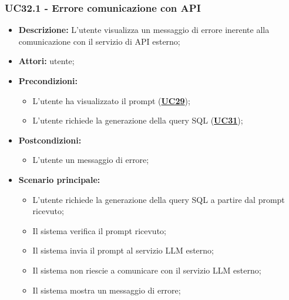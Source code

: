\subsubsection{UC32.1 - Errore comunicazione con API}
\label{sec:UC32.1}
\begin{itemize}
	\item \textbf{Descrizione:} L'utente visualizza un messaggio di errore inerente alla comunicazione con il servizio di API esterno;
	\item \textbf{Attori:} utente;
	\item \textbf{Precondizioni:} 
	\begin{itemize}
		\item L'utente ha visualizzato il prompt (\hyperref[sec:UC29]{\textbf{UC29}});
		\item L'utente richiede la generazione della query SQL (\hyperref[sec:UC31]{\textbf{UC31}});
	\end{itemize}
	\item \textbf{Postcondizioni:} 
	\begin{itemize}
		\item L'utente un messaggio di errore;
	\end{itemize}
	\item \textbf{Scenario principale:}
	\begin{itemize}
		\item L'utente richiede la generazione della query SQL a partire dal prompt ricevuto;
		\item Il sistema verifica il prompt ricevuto;
		\item Il sistema invia il prompt al servizio LLM esterno;
		\item Il sistema non riescie a comunicare con il servizio LLM esterno;
		\item Il sistema mostra un messaggio di errore;
	\end{itemize}
\end{itemize}

